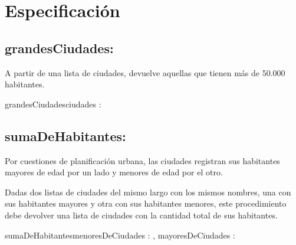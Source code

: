 \documentclass[10pt,a4paper]{article}
\begin{document}
\maketitle
\section{Especificación}


\subsection{grandesCiudades:}

A partir de una lista de ciudades, devuelve aquellas que tienen más de 50.000 habitantes.\\

\begin{proc}{grandesCiudades}{\In ciudades : \TLista{\str\times\ent}}{\TLista{\str\times\ent}}
\end{proc}


\subsection{sumaDeHabitantes:}

Por cuestiones de planificación urbana, las ciudades registran sus habitantes mayores de edad por un lado y menores de edad por el otro.

Dadas dos listas de ciudades del mismo largo con los mismos nombres, una con sus habitantes mayores y otra con sus habitantes menores, este procedimiento debe devolver una lista de ciudades con la cantidad total de sus habitantes.\\

\begin{proc}{sumaDeHabitantes}{\In menoresDeCiudades : \TLista{\str\times\ent}, \In mayoresDeCiudades : \TLista{\str\times\ent}}{\TLista{\str\times\ent}}
\end{proc}
\end{document}
